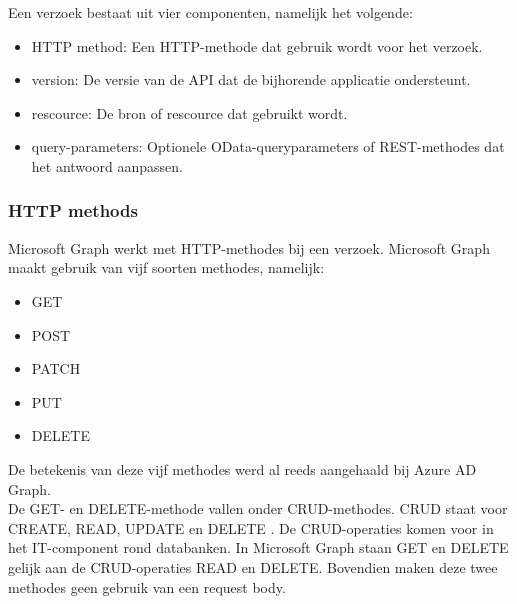 Een verzoek bestaat uit vier componenten, namelijk het volgende:

\begin{itemize}
    \item \ac{HTTP} method: Een \ac{HTTP}-methode dat gebruik wordt voor het verzoek.
    \item version: De versie van de \ac{API} dat de bijhorende applicatie ondersteunt.
    \item rescource: De bron of rescource dat gebruikt wordt.
    \item query-parameters: Optionele OData-queryparameters of \Ac{REST}-methodes dat het antwoord aanpassen.
\end{itemize}

\begin{comment}
Wanneer er een verzoek wordt verstuurd, krijgt dit ook een antwoord terug. Een antwoord bestaat uit minstens volgende onderdelen: 

\begin{itemize}
    \item Status code:
    \item Response message:
    \item @odata.nextLink:
\end{itemize}
\end{comment}

\subsubsection{HTTP methods}

Microsoft Graph werkt met \Ac{HTTP}-methodes bij een verzoek. Microsoft Graph maakt gebruik van vijf soorten methodes, namelijk:

\begin{itemize}
    \item GET
    \item POST
    \item PATCH
    \item PUT
    \item DELETE
\end{itemize}

De betekenis van deze vijf methodes werd al reeds aangehaald bij Azure \Ac{AD} Graph. \\

De GET- en DELETE-methode vallen onder CRUD-methodes. CRUD staat voor CREATE, READ, UPDATE en DELETE \autocite{Truica2015}. De CRUD-operaties komen voor in het \ac{IT}-component rond databanken. In Microsoft Graph staan GET en DELETE gelijk aan de CRUD-operaties READ en DELETE. Bovendien maken deze twee methodes geen gebruik van een request body. \\

